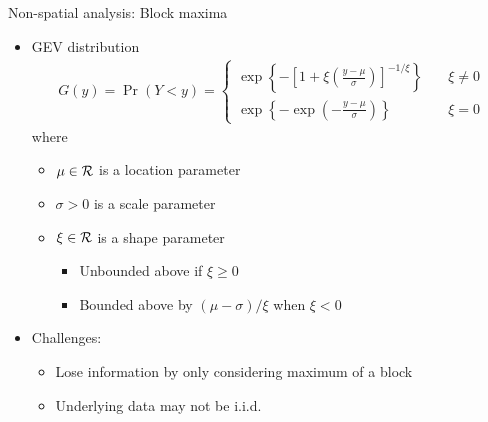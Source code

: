 \documentclass{beamer}
\begin{document}
\begin{frame}{Non-spatial analysis: Block maxima}
	\begin{itemize} \setlength{\itemsep}{1em}
		\item GEV distribution
		\begin{align*}
			G(y) = \Pr(Y < y) = \begin{cases}
			\exp\left\{ -\left[ 1 + \xi \left( \frac{ y - \mu }{ \sigma } \right) \right]^{ -1 / \xi} \right\} & \quad \xi \neq 0 \\[0.5em]
			\exp \left\{ -\exp \left( - \frac{ y - \mu }{ \sigma} \right) \right\} & \quad \xi = 0
			\end{cases}
		\end{align*}
		where
		\begin{itemize} \setlength{\itemsep}{0.25em}
			\item $\mu \in {\cal R}$ is a location parameter
			\item $\sigma > 0$ is a scale parameter
			\item $\xi \in {\cal R}$ is a shape parameter
			\begin{itemize}
				\item Unbounded above if $\xi \ge 0$
				\item Bounded above by $(\mu - \sigma) / \xi$ when $\xi < 0$
			\end{itemize}
		\end{itemize}
		\item Challenges:
		\begin{itemize}
			\item Lose information by only considering maximum of a block
			\item Underlying data may not be i.i.d.
		\end{itemize}
	\end{itemize}
\end{frame}
\end{document}
